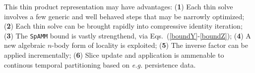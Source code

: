 \documentclass[letterpaper,twocolumn,amsmath,amsfont,amssymb,english,aps,jcp,preprintnumbers,groupaddress,nofootinbib,tightenlines,floatfix]{revtex4}
\newcommand{\mat}[1]{\boldsymbol{#1}}
\theoremstyle{plain}
\theoremstyle{remark}
\theoremstyle{plain}
\begin{document}
This thin product representation may have advantages: 
({\bf{1}}) Each thin solve involves a few generic and well behaved steps that may be narrowly optimized;
({\bf{2}}) Each thin solve can be brought rapidly into compressive identity iteration; 
({\bf{3}}) The {\tt SpAMM} bound is vastly strengthend, via Eqs.~(\ref{boundY}-\ref{boundZ}); 
({\bf{4}}) A new algebraic $n$-body form of locality is exploited; 
({\bf{5}}) The inverse factor can be applied incrementally;
({\bf{6}}) Slice update and application is ammenable to continous temporal partitioning based on {\em e.g.} persistence data.

\end{document}
